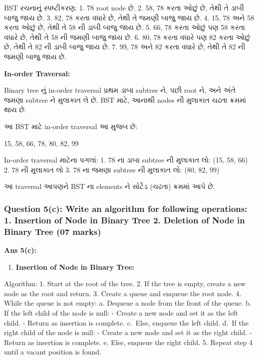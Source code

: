 BST રચનાનું સ્પષ્ટીકરણ: 1. 78 root node છે. 2. 58, 78 કરતા ઓછું છે, તેથી તે ડાબી
બાજુ જાય છે. 3. 82, 78 કરતા વધારે છે, તેથી તે જમણી બાજુ જાય છે. 4. 15, 78 અને 58
કરતા ઓછું છે, તેથી તે 58 ની ડાબી બાજુ જાય છે. 5. 66, 78 કરતા ઓછું પણ 58 કરતા વધારે
છે, તેથી તે 58 ની જમણી બાજુ જાય છે. 6. 80, 78 કરતા વધારે પણ 82 કરતા ઓછું છે, તેથી
તે 82 ની ડાબી બાજુ જાય છે. 7. 99, 78 અને 82 કરતા વધારે છે, તેથી તે 82 ની જમણી
બાજુ જાય છે.

\textbf{In-order Traversal:}

Binary tree નું in-order traversal પ્રથમ ડાબા subtree ને, પછી root ને, અને અંતે
જમણા subtree ને મુલાકાત લે છે. BST માટે, આનાથી nodes ની મુલાકાત ચઢતા ક્રમમાં થાય
છે.

આ BST માટે in-order traversal આ મુજબ છે:

15, 58, 66, 78, 80, 82, 99

In-order traversal માટેના પગલાં: 1. 78 ના ડાબા subtree ની મુલાકાત લો: (15,
58, 66) 2. 78 ની મુલાકાત લો 3. 78 ના જમણા subtree ની મુલાકાત લો: (80, 82,
99)

આ traversal આપણને BST ના elements ને સોર્ટેડ (ચઢતા) ક્રમમાં આપે છે.

\hypertarget{question-5c-write-an-algorithm-for-following-operations-1.-insertion-of-node-in-binary-tree-2.-deletion-of-node-in-binary-tree-07-marks}{%
\subsubsection{Question 5(c): Write an algorithm for following
operations: 1. Insertion of Node in Binary Tree 2. Deletion of Node in
Binary Tree (07
marks)}\label{question-5c-write-an-algorithm-for-following-operations-1.-insertion-of-node-in-binary-tree-2.-deletion-of-node-in-binary-tree-07-marks}}

\textbf{Ans 5(c):}

\begin{enumerate}
\def\labelenumi{\arabic{enumi}.}
\tightlist
\item
  \textbf{Insertion of Node in Binary Tree:}
\end{enumerate}

Algorithm: 1. Start at the root of the tree. 2. If the tree is empty,
create a new node as the root and return. 3. Create a queue and enqueue
the root node. 4. While the queue is not empty: a. Dequeue a node from
the front of the queue. b. If the left child of the node is null: -
Create a new node and set it as the left child. - Return as insertion is
complete. c.~Else, enqueue the left child. d.~If the right child of the
node is null: - Create a new node and set it as the right child. -
Return as insertion is complete. e. Else, enqueue the right child. 5.
Repeat step 4 until a vacant position is found.


